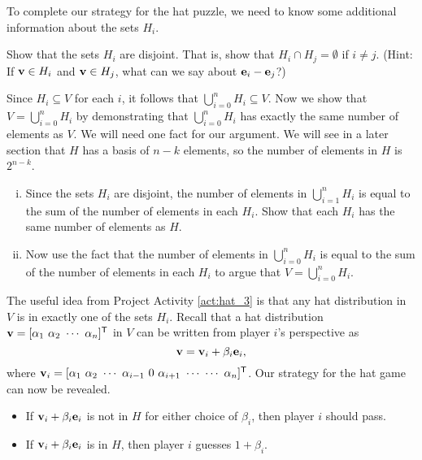 \begin{pactivity} \label{act:hat_3} To complete our strategy for the hat puzzle, we need to know some additional information about the sets $H_i$. 
	\ba
	\item Show that the sets $H_i$ are disjoint. That is, show that $H_i \cap H_j = \emptyset$ if $i \neq j$. (Hint: If $\mathbf{v} \in H_i$ and $\mathbf{v} \in H_j$, what can we say about $\mathbf{e}_i - \mathbf{e}_j$?) 


	\item Since $H_i \subseteq V$ for each $i$, it follows that $\bigcup_{i=0}^n H_i \subseteq V$. Now we show that $V = \bigcup_{i=0}^n H_i$ by demonstrating that $\bigcup_{i=0}^n H_i$ has exactly the same number of elements as $V$. We will need one fact for our argument. We will see in a later section that $H$ has a basis of $n-k$ elements, so the number of elements in $H$ is $2^{n-k}$. 

		\begin{enumerate}[i.]
		\item Since the sets $H_i$ are disjoint, the number of elements in $\bigcup_{i=1}^n H_i$ is equal to the sum of the number of elements in each $H_i$. Show that each $H_i$ has the same number of elements as $H$. 


		\item Now use the fact that the number of elements in $\bigcup_{i=0}^n H_i$ is equal to the sum of the number of elements in each $H_i$ to argue that $V = \bigcup_{i=0}^n H_i$.
	
		\end{enumerate}

	\ea
\end{pactivity}


The useful idea from Project Activity \ref{act:hat_3} is that any hat distribution in $V$ is in exactly one of the sets $H_i$.  Recall that a hat distribution $\mathbf{v} = [\alpha_1 \ \alpha_2 \ \cdots \ \alpha_n]^{\mathsf{T}}$ in $V$ can be written from player $i$'s perspective as  
\[\mathbf{v} = \mathbf{v}_i + \beta_i \mathbf{e}_i,\]
where $\vv_i =  [\alpha_1 \ \alpha_2 \ \cdots \ \alpha_{i-1} \ 0 \ \alpha_{i+1} \ \cdots \ \cdots \ \alpha_n]^{\tr}$. Our strategy for the hat game can now be revealed.
\begin{itemize}
 \item If $\mathbf{v}_i + \beta_i \mathbf{e}_i$ is not in $H$ for either choice of $\beta_i$, then player $i$ should pass.
 \item If $\mathbf{v}_i + \beta_i \mathbf{e}_i$ is in $H$, then player $i$ guesses $1 + \beta_i$. 
 \end{itemize}
 
